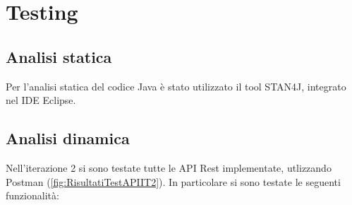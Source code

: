 \section{Testing}
\subsection{Analisi statica}
Per l'analisi statica del codice Java è stato utilizzato il tool STAN4J, integrato nel IDE Eclipse.

\subsection{Analisi dinamica}
Nell'iterazione 2 si sono testate tutte le API Rest implementate, utlizzando Postman (\Fig \ref{fig:RisultatiTestAPIIT2}). In particolare si sono testate le seguenti funzionalità:


